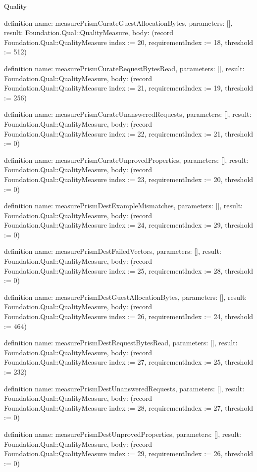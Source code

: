 \begin{lexlean}{Quality}
\begin{semanticmodule}
definition{
  name: measurePrismCurateGuestAllocationBytes,
  parameters: [],
  result: Foundation.Qual::QualityMeasure,
  body: (record Foundation.Qual::QualityMeasure {index := 20, requirementIndex := 18, threshold := 512})
}

definition{
  name: measurePrismCurateRequestBytesRead,
  parameters: [],
  result: Foundation.Qual::QualityMeasure,
  body: (record Foundation.Qual::QualityMeasure {index := 21, requirementIndex := 19, threshold := 256})
}

definition{
  name: measurePrismCurateUnansweredRequests,
  parameters: [],
  result: Foundation.Qual::QualityMeasure,
  body: (record Foundation.Qual::QualityMeasure {index := 22, requirementIndex := 21, threshold := 0})
}

definition{
  name: measurePrismCurateUnprovedProperties,
  parameters: [],
  result: Foundation.Qual::QualityMeasure,
  body: (record Foundation.Qual::QualityMeasure {index := 23, requirementIndex := 20, threshold := 0})
}

definition{
  name: measurePrismDestExampleMismatches,
  parameters: [],
  result: Foundation.Qual::QualityMeasure,
  body: (record Foundation.Qual::QualityMeasure {index := 24, requirementIndex := 29, threshold := 0})
}

definition{
  name: measurePrismDestFailedVectors,
  parameters: [],
  result: Foundation.Qual::QualityMeasure,
  body: (record Foundation.Qual::QualityMeasure {index := 25, requirementIndex := 28, threshold := 0})
}

definition{
  name: measurePrismDestGuestAllocationBytes,
  parameters: [],
  result: Foundation.Qual::QualityMeasure,
  body: (record Foundation.Qual::QualityMeasure {index := 26, requirementIndex := 24, threshold := 464})
}

definition{
  name: measurePrismDestRequestBytesRead,
  parameters: [],
  result: Foundation.Qual::QualityMeasure,
  body: (record Foundation.Qual::QualityMeasure {index := 27, requirementIndex := 25, threshold := 232})
}

definition{
  name: measurePrismDestUnansweredRequests,
  parameters: [],
  result: Foundation.Qual::QualityMeasure,
  body: (record Foundation.Qual::QualityMeasure {index := 28, requirementIndex := 27, threshold := 0})
}

definition{
  name: measurePrismDestUnprovedProperties,
  parameters: [],
  result: Foundation.Qual::QualityMeasure,
  body: (record Foundation.Qual::QualityMeasure {index := 29, requirementIndex := 26, threshold := 0})
}


\end{semanticmodule}
\end{lexlean}
